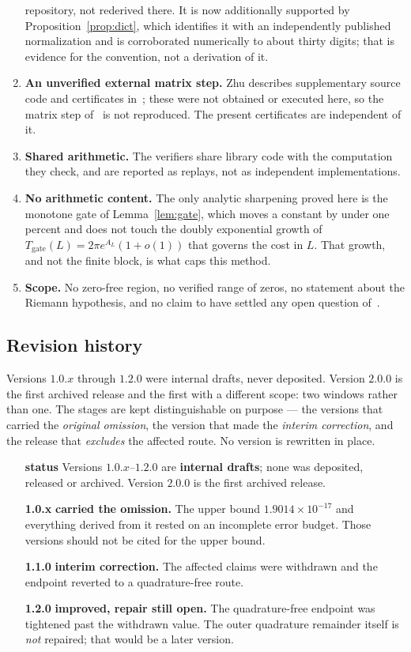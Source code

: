 \documentclass[11pt,a4paper]{article}
\theoremstyle{definition}
\theoremstyle{remark}
\begin{document}
\begin{enumerate}
  repository, not rederived there. It is now additionally supported by
  Proposition~\ref{prop:dict}, which identifies it with an independently
  published normalization and is corroborated numerically to about thirty
  digits; that is evidence for the convention, not a derivation of it.
\item \textbf{An unverified external matrix step.} Zhu describes supplementary
  source code and certificates in~\cite[\S17]{Zhu}; these were not obtained or
  executed here, so the matrix step of~\cite[Thm.~1.1]{Zhu} is not reproduced.
  The present certificates are independent of it.
\item \textbf{Shared arithmetic.} The verifiers share library code with the
  computation they check, and are reported as replays, not as independent
  implementations.
\item \textbf{No arithmetic content.} The only analytic sharpening proved here
  is the monotone gate of Lemma~\ref{lem:gate}, which moves a constant by under
  one percent and does not touch the doubly exponential growth of
  $T_{\mathrm{gate}}(L) = 2\pi e^{A_L}(1+o(1))$ that governs the cost in $L$.
  That growth, and not the finite block, is what caps this method.
\item \textbf{Scope.} No zero-free region, no verified range of zeros, no
  statement about the Riemann hypothesis, and no claim to have settled any open
  question of~\cite{ACLG}.
\end{enumerate}

\subsection{Revision history}
\label{sec:history}

Versions $1.0.x$ through $1.2.0$ were internal drafts, never deposited. Version
$2.0.0$ is the first archived release and the first with a different scope: two
windows rather than one. The stages are kept distinguishable on purpose --- the
versions that carried the \emph{original omission}, the version that made the
\emph{interim correction}, and the release that \emph{excludes} the affected
route. No version is rewritten in place.

\begin{itemize}
\item[\textbf{status}] Versions $1.0.x$--$1.2.0$ are \textbf{internal drafts};
  none was deposited, released or archived. Version $2.0.0$ is the first
  archived release.
\item[\textbf{1.0.x}] \textbf{carried the omission.} The upper bound
  $1.9014\times10^{-17}$ and everything derived from it rested on an incomplete
  error budget. Those versions should not be cited for the upper bound.
\item[\textbf{1.1.0}] \textbf{interim correction.} The affected claims were
  withdrawn and the endpoint reverted to a quadrature-free route.
\item[\textbf{1.2.0}] \textbf{improved, repair still open.} The
  quadrature-free endpoint was tightened past the withdrawn value. The outer
  quadrature remainder itself is \emph{not} repaired; that would be a later
  version.
\end{itemize}
\end{document}
